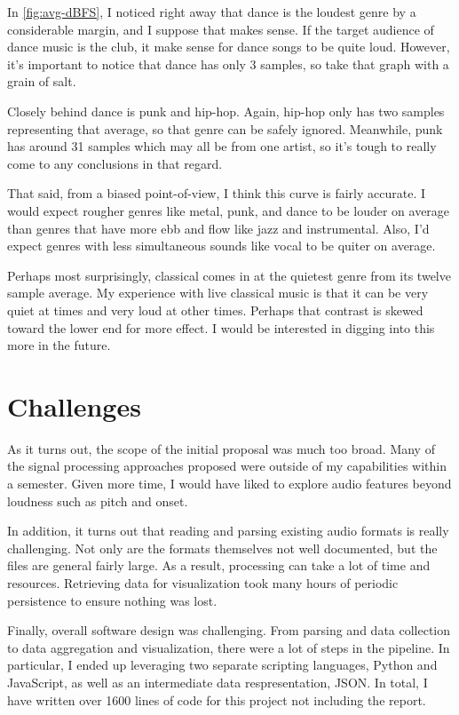 \documentclass[journal]{vgtc}                %
\begin{document}
In \autoref{fig:avg-dBFS}, I noticed right away that dance is the loudest genre
by a considerable margin, and I suppose that makes sense. If the target audience
of dance music is the club, it make sense for dance songs to be quite loud.
However, it's important to notice that dance has only 3 samples, so take that
graph with a grain of salt.

Closely behind dance is punk and hip-hop. Again, hip-hop only has two samples
representing that average, so that genre can be safely ignored. Meanwhile,
punk has around 31 samples which may all be from one artist, so it's tough
to really come to any conclusions in that regard.

That said, from a biased point-of-view, I think this curve is fairly accurate.
I would expect rougher genres like metal, punk, and dance to be louder on
average than genres that have more ebb and flow like jazz and instrumental.
Also, I'd expect genres with less simultaneous sounds like vocal to be
quiter on average.

Perhaps most surprisingly, classical comes in at the quietest genre from its
twelve sample average. My experience with live classical music is that it can
be very quiet at times and very loud at other times. Perhaps that contrast
is skewed toward the lower end for more effect. I would be interested in digging
into this more in the future.

\section{Challenges}

As it turns out, the scope of the initial proposal was much too broad. Many of
the signal processing approaches proposed were outside of my capabilities within
a semester. Given more time, I would have liked to explore audio features beyond
loudness such as pitch and onset.

In addition, it turns out that reading and parsing existing audio formats is
really challenging. Not only are the formats themselves not well documented, but
the files are general fairly large. As a result, processing can take a lot of
time and resources. Retrieving data for visualization took many hours of
periodic persistence to ensure nothing was lost.

Finally, overall software design was challenging. From parsing and data collection
to data aggregation and visualization, there were a lot of steps in the pipeline.
In particular, I ended up leveraging two separate scripting languages, Python
and JavaScript, as well as an intermediate data respresentation, JSON. In total,
I have written over 1600 lines of code for this project not including the report.
\end{document}
